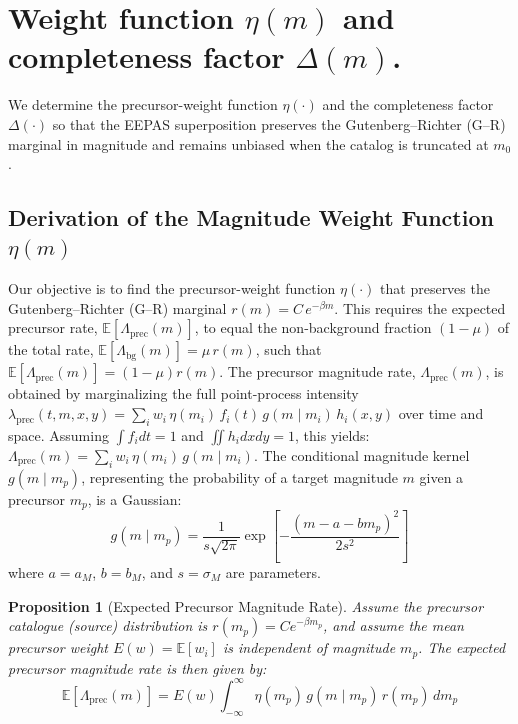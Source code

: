 \documentclass[linenum,doublespace,onecolumn]{SSA-SRL}
\theoremstyle{lemma}
\newcommand{\E}{\mathbb{E}}
\newtheorem{proposition}{Proposition}
\begin{document}
\section{Weight function \texorpdfstring{$\eta(m)$}{eta(m)} and completeness factor \texorpdfstring{$\Delta(m)$}{Delta(m)}.} \label{sec:compensation}


We determine the precursor-weight function $\eta(\cdot)$ and the completeness factor $\Delta(\cdot)$ so that the EEPAS superposition preserves the Gutenberg--Richter (G--R) marginal in magnitude and remains unbiased when the catalog is truncated at $m_0$.



\subsection{Derivation of the Magnitude Weight Function \(\eta(m)\)}
Our objective is to find the precursor-weight function $\eta(\cdot)$ that preserves the Gutenberg--Richter (G--R) marginal $r(m)=C\,e^{-\beta m}$. This requires the expected precursor rate, $\E[\Lambda_{\mathrm{prec}}(m)]$, to equal the non-background fraction $(1-\mu)$ of the total rate, $\E[\Lambda_{\text{bg}}(m)] = \mu \, r(m)$, such that $\E[\Lambda_{\mathrm{prec}}(m)] = (1-\mu)r(m)$.
The precursor magnitude rate, $\Lambda_{\mathrm{prec}}(m)$, is obtained by marginalizing the full point-process intensity $\lambda_{\mathrm{prec}}(t,m,x,y) = \sum_i w_i \, \eta(m_i) \, f_i(t) \, g(m \mid m_i) \, h_i(x,y)$ over time and space. Assuming $\int f_i dt = 1$ and $\iint h_i dx dy = 1$, this yields: $\Lambda_{\mathrm{prec}}(m) = \sum_i w_i \, \eta(m_i) \, g(m \mid m_i)$. The conditional magnitude kernel $g(m \mid m_p)$, representing the probability of a target magnitude $m$ given a precursor $m_p$, is a Gaussian:
\begin{equation}\label{eq:g-kernel}
g(m \mid m_p) = \frac{1}{s\sqrt{2\pi}} \exp\!\left[-\frac{(m-a-b m_p)^2}{2s^2}\right]
\end{equation}
where $a=a_M$, $b=b_M$, and $s=\sigma_M$ are parameters.

\begin{proposition}[Expected Precursor Magnitude Rate]
Assume the precursor catalogue (source) distribution is \(r(m_p) = C e^{-\beta m_p}\), and assume the mean precursor weight \(E(w) = \E[w_i]\) is independent of magnitude \(m_p\). The expected precursor magnitude rate is then given by:
\[
\E[\Lambda_{\mathrm{prec}}(m)] = E(w) \int_{-\infty}^{\infty} \eta(m_p) \, g(m \mid m_p) \, r(m_p) \, dm_p
\]
\end{proposition}
\end{document}
